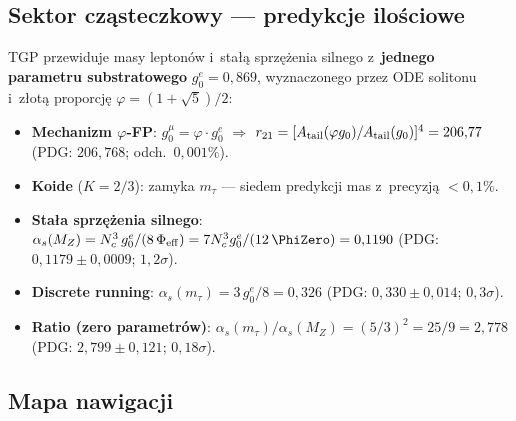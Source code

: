 \subsection*{Sektor cz\k{a}steczkowy --- predykcje ilo\'sciowe}

TGP przewiduje masy lepton\'ow i~sta\l{}\k{a} sprz\k{e}\.zenia
silnego z~\textbf{jednego parametru substratowego} $g_0^e = 0{,}869$,
wyznaczonego przez ODE solitonu i~z\l{}ot\k{a} proporcj\k{e}
$\varphi = (1+\sqrt{5})/2$:

\begin{itemize}[nosep]
\item \textbf{Mechanizm $\varphi$-FP}: $g_0^\mu = \varphi \cdot g_0^e$
  \;\;$\Rightarrow$\;\; $r_{21} = [A_{\rm tail}(\varphi g_0)/A_{\rm tail}(g_0)]^4 = 206{,}77$
  (PDG: $206{,}768$; odch.\ $0{,}001\%$).
\item \textbf{Koide} ($K = 2/3$): zamyka $m_\tau$ --- siedem predykcji mas z~precyzj\k{a} $< 0{,}1\%$.
\item \textbf{Sta\l{}a sprz\k{e}\.zenia silnego}:
  $\alpha_s(M_Z) = N_c^3\, g_0^e/(8\,\Phi_{\rm eff})
  = 7 N_c^3 g_0^e/(12\,\PhiZero) = 0{,}1190$
  (PDG: $0{,}1179 \pm 0{,}0009$; $1{,}2\sigma$).
\item \textbf{Discrete running}:
  $\alpha_s(m_\tau) = 3\,g_0^e/8 = 0{,}326$
  (PDG: $0{,}330 \pm 0{,}014$; $0{,}3\sigma$).
\item \textbf{Ratio (zero parametr\'ow)}:
  $\alpha_s(m_\tau)/\alpha_s(M_Z) = (5/3)^2 = 25/9 = 2{,}778$
  (PDG: $2{,}799 \pm 0{,}121$; $0{,}18\sigma$).
\end{itemize}



\subsection*{Mapa nawigacji}

